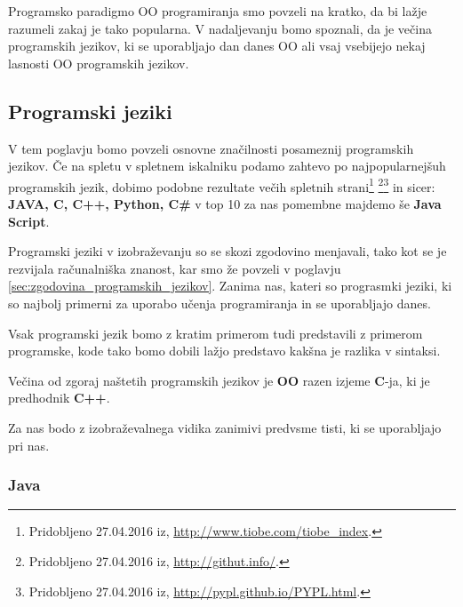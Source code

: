 Programsko paradigmo OO programiranja smo povzeli na kratko, da bi
lažje razumeli zakaj je tako popularna. V nadaljevanju bomo spoznali,
da je večina programskih jezikov, ki se uporabljajo dan danes OO ali
vsaj vsebijejo nekaj lasnosti OO programskih jezikov.

\subsection{Programski jeziki}
\label{sec:programski_jeziki}

V tem poglavju bomo povzeli osnovne značilnosti posameznij programskih
jezikov.  Če na spletu v spletnem iskalniku podamo zahtevo
po najpopularnejšuh programskih jezik, dobimo podobne rezultate
večih spletnih strani\footnote{Pridobljeno 27.04.2016 iz,
  \url{http://www.tiobe.com/tiobe_index}.}  \footnote{Pridobljeno
  27.04.2016 iz, \url{http://githut.info/}.}\footnote{Pridobljeno
  27.04.2016 iz, \url{http://pypl.github.io/PYPL.html}.}  in sicer: \textbf{JAVA,
  C, C++, Python, C\#} v top 10 za nas pomembne majdemo še
\textbf{Java Script}. %

Programski jeziki v izobraževanju so se skozi zgodovino menjavali,
tako kot se je rezvijala računalniška znanost, kar smo že povzeli v
poglavju \ref{sec:zgodovina_programskih_jezikov}. Zanima nas, kateri so
prograsmki jeziki, ki so najbolj primerni za uporabo učenja
programiranja in se uporabljajo danes.

Vsak programski jezik bomo z kratim primerom tudi predstavili z
primerom programske, kode tako bomo dobili lažjo predstavo kakšna je
razlika v sintaksi.

Večina od zgoraj naštetih programskih jezikov je \textbf{OO} razen
izjeme \textbf{C}-ja, ki je predhodnik \textbf{C++}.




Za nas bodo z izobraževalnega vidika zanimivi predvsme tisti, ki se
uporabljajo pri nas.

\subsubsection{Java}
\label{sec:pj:JAVA}

